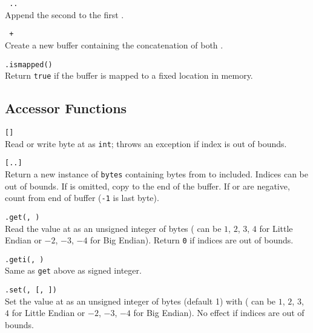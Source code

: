 \hangpar {}\texttt{ .. }\\
Append the second  to the first .

\hangpar {}\texttt{ + }\\
Create a new  buffer containing the concatenation of both .

\hangpar {}\texttt{.ismapped()}\\
Return \texttt{true} if the buffer is mapped to a fixed location in memory.

\subsection*{Accessor Functions}

\hangpar {}\texttt{[}\texttt{]} \\
Read or write byte at  as \texttt{int}; throws an exception if index is out of bounds.

\hangpar {}\texttt{[}\texttt{..}\texttt{]} \\
Return a new instance of \texttt{bytes} containing bytes from  to  included. Indices can be out of bounds. If  is omitted, copy to the end of the buffer. If  or  are negative, count from end of buffer (\texttt{-1} is last byte).

\hangpar {}\texttt{.get(}\texttt{, }\texttt{)} \\
Read the value at  as an unsigned integer of  bytes ( can be $1$, $2$, $3$, $4$ for Little Endian or $-2$, $-3$, $-4$ for Big Endian). Return \texttt{0} if indices are out of bounds.

\hangpar {}\texttt{.geti(}\texttt{, }\texttt{)} \\
Same as \texttt{get} above as signed integer.

\hangpar {}\texttt{.set(}\texttt{, }\texttt{[, }\texttt{])} \\
Set the value at  as an unsigned integer of  bytes (default 1) with  ( can be $1$, $2$, $3$, $4$ for Little Endian or $-2$, $-3$, $-4$ for Big Endian). No effect if indices are out of bounds.

